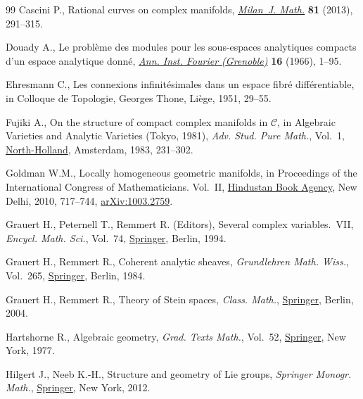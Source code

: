 \documentclass[11pt]{article}
\numberwithin{equation}{section}
\numberwithin{equation}{section}
\begin{document}
\begin{thebibliography}{99}
Cascini P., Rational curves on complex manifolds, \href{https://doi.org/10.1007/s00032-013-0210-6}{\textit{Milan~J. Math.}}
 \textbf{81} (2013), 291--315.

Douady A., Le probl\`eme des modules pour les sous-espaces analytiques compacts
 d'un espace analytique donn\'e, \href{https://doi.org/10.5802/aif.226}{\textit{Ann. Inst. Fourier (Grenoble)}}
 \textbf{16} (1966), 1--95.

Ehresmann C., Les connexions infinit\'esimales dans un espace fibr\'e
 diff\'erentiable, in Colloque de {T}opologie, Georges Thone, Li\`ege, 1951,
 29--55.

Fujiki A., On the structure of compact complex manifolds in {${\mathcal C}$},
 in Algebraic {V}arieties and {A}nalytic {V}arieties ({T}okyo, 1981),
 \textit{Adv. Stud. Pure Math.}, Vol.~1, \href{https://doi.org/10.2969/aspm/00110231}{North-Holland}, Amsterdam, 1983,
 231--302.

Goldman W.M., Locally homogeneous geometric manifolds, in Proceedings of the
 {I}nternational {C}ongress of {M}athematicians. {V}ol.~{II}, \href{https://doi.org/10.1142/9789814324359_0071}{Hindustan Book
 Agency}, New Delhi, 2010, 717--744, \href{https://arxiv.org/abs/1003.2759}{arXiv:1003.2759}.

Grauert H., Peternell T., Remmert R. (Editors), Several complex
 variables.~{VII}, \textit{Encycl. Math. Sci.}, Vol.~74, \href{https://doi.org/10.1007/978-3-662-09873-8}{Springer}, Berlin,
 1994.

Grauert H., Remmert R., Coherent analytic sheaves, \textit{Grundlehren Math.
 Wiss.}, Vol.~265, \href{https://doi.org/10.1007/978-3-642-69582-7}{Springer}, Berlin, 1984.

Grauert H., Remmert R., Theory of {S}tein spaces, \textit{Class. Math.}, \href{https://doi.org/10.1007/978-3-642-18921-0}{Springer},
 Berlin, 2004.

Hartshorne R., Algebraic geometry, \textit{Grad. Texts Math.}, Vol.~52,
 \href{https://doi.org/10.1007/978-1-4757-3849-0}{Springer}, New York, 1977.

Hilgert J., Neeb K.-H., Structure and geometry of {L}ie groups, \textit{Springer Monogr. Math.}, \href{https://doi.org/10.1007/978-0-387-84794-8}{Springer}, New York, 2012.


\end{thebibliography}
\end{document}
